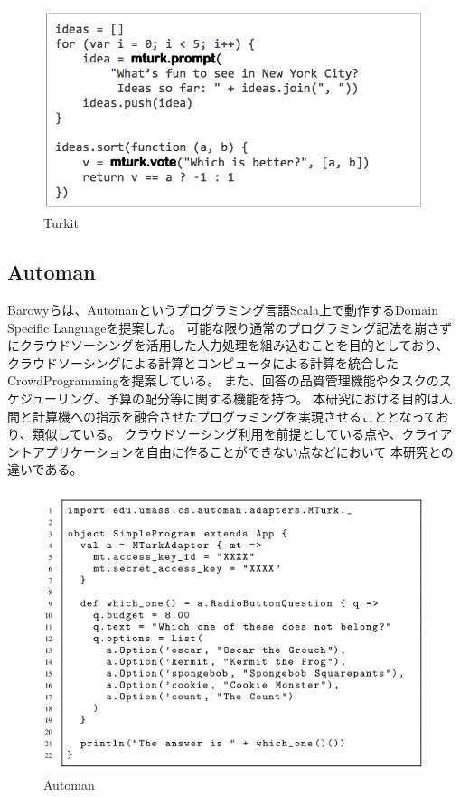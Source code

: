\begin{figure}[htbp]
  \begin{center}
  \includegraphics[width=.6\linewidth,bb=0 0 651 345]{images/turkit.png}
  \end{center}
  \caption{Turkit}
  \label{fig:turkit}
\end{figure}

\subsection{Automan}\label{automan}

Barowyらは、Automanというプログラミング言語Scala上で動作するDomain
Specific Languageを提案した\cite{automan}。
可能な限り通常のプログラミング記法を崩さずにクラウドソーシングを活用した人力処理を組み込むことを目的としており、
クラウドソーシングによる計算とコンピュータによる計算を統合したCrowdProgrammingを提案している。
また、回答の品質管理機能やタスクのスケジューリング、予算の配分等に関する機能を持つ。
本研究における目的は人間と計算機への指示を融合させたプログラミングを実現させることとなっており、類似している。
クラウドソーシング利用を前提としている点や、クライアントアプリケーションを自由に作ることができない点などにおいて
本研究との違いである。

\begin{figure}[htbp]
  \begin{center}
  \includegraphics[width=.6\linewidth,bb=0 0 552 404]{images/automan.png}
  \end{center}
  \caption{Automan}
  \label{fig:automan}
\end{figure}

